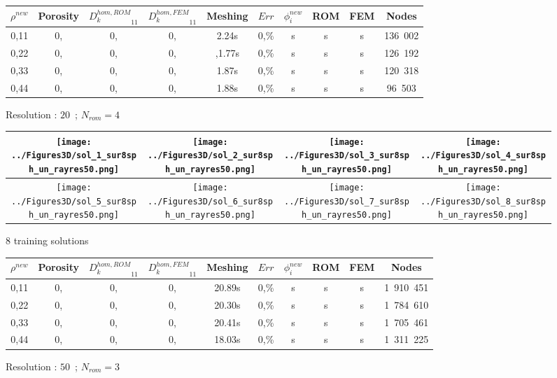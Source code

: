 {\begin{figure}[H]%
%
\begin{center}
\begin{tabular}{|c|c||c|c||c|c||c|c||c||c|}
\hline
\rowcolor{lightgray} $\rho^{new}$&Porosity&${D_k^{hom,ROM}}_{11}$&${D_k^{hom,FEM}}_{11}$&Meshing&$Err$&$\phi_i^{new}$&ROM&FEM&Nodes\\
\hline
0,11&0,&0,&0,&2.24s&0,\%&s&s&s&136\ 002\\
\hline
0,22&0,&0,&0,&,1.77s&0,\%&s&s&s&126\ 192\\
\hline
0,33&0,&0,&0,&1.87s&0,\%&s&s&s&120\ 318\\
\hline
0,44&0,&0,&0,&1.88s&0,\%&s&s&s&96\ 503\\
\hline
\end{tabular}
\end{center}
\caption{Resolution : $20$\ ; $N_{rom}=4$}
%
\end{figure}

\ligneinter
\begin{figure}[H]%
%
\begin{center}
\begin{tabular}{|c|c|c|c|}
\hline
\texttt{[image: ../Figures3D/sol\_1\_sur8sph\_un\_rayres50.png]}%
&%
\texttt{[image: ../Figures3D/sol\_2\_sur8sph\_un\_rayres50.png]}%
&%
\texttt{[image: ../Figures3D/sol\_3\_sur8sph\_un\_rayres50.png]}%
&%
\texttt{[image: ../Figures3D/sol\_4\_sur8sph\_un\_rayres50.png]}%
\\
\hline
\texttt{[image: ../Figures3D/sol\_5\_sur8sph\_un\_rayres50.png]}%
&%
\texttt{[image: ../Figures3D/sol\_6\_sur8sph\_un\_rayres50.png]}%
&%
\texttt{[image: ../Figures3D/sol\_7\_sur8sph\_un\_rayres50.png]}%
&%
\texttt{[image: ../Figures3D/sol\_8\_sur8sph\_un\_rayres50.png]}%
\\
\hline
\end{tabular}
\end{center}
\caption{$8$ training solutions}
%
\end{figure}

\begin{figure}[H]%
%
\begin{center}
\begin{tabular}{|c|c||c|c||c|c||c|c||c||c|}
\hline
\rowcolor{lightgray} $\rho^{new}$&Porosity&${D_k^{hom,ROM}}_{11}$&${D_k^{hom,FEM}}_{11}$&Meshing&$Err$&$\phi_i^{new}$&ROM&FEM&Nodes\\
\hline
0,11&0,&0,&0,&20.89s&0,\%&s&s&s&1\ 910\ 451\\
\hline
0,22&0,&0,&0,&20.30s&0,\%&s&s&s&1\ 784\ 610\\
\hline
0,33&0,&0,&0,&20.41s&0,\%&s&s&s&1\ 705\ 461\\
\hline
0,44&0,&0,&0,&18.03s&0,\%&s&s&s&1\ 311\ 225\\
\hline
\end{tabular}
\end{center}
\caption{Resolution : $50$\ ; $N_{rom}=3$}
%
\end{figure}

}

